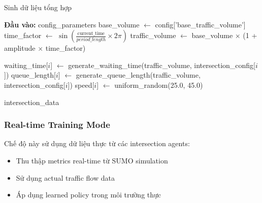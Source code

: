 
\begin{algorithm}[!htp]
    \caption{Sinh dữ liệu tổng hợp}
    \begin{algorithmic}[1]
        \State \textbf{Đầu vào:} config\_parameters
        \State base\_volume $\leftarrow$ config['base\_traffic\_volume'] 
        \State time\_factor $\leftarrow$ $\sin(\frac{\text{current\_time}}{period\_length} \times 2\pi)$
        \State traffic\_volume $\leftarrow$ base\_volume $\times$ (1 + amplitude $\times$ time\_factor) 
        
            \State waiting\_time[$i$] $\leftarrow$ generate\_waiting\_time(traffic\_volume, intersection\_config[$i$])
            \State queue\_length[$i$] $\leftarrow$ generate\_queue\_length(traffic\_volume, intersection\_config[$i$])
            \State speed[$i$] $\leftarrow$ uniform\_random(25.0, 45.0) 
        \EndFor 
        
        \State \Return intersection\_data
    \end{algorithmic}
\end{algorithm}

\subsubsection{Real-time Training Mode}
Chế độ này sử dụng dữ liệu thực từ các intersection agents:
\begin{itemize}
    \item Thu thập metrics real-time từ SUMO simulation

    \item Sử dụng actual traffic flow data

    \item Áp dụng learned policy trong môi trường thực
\end{itemize}

